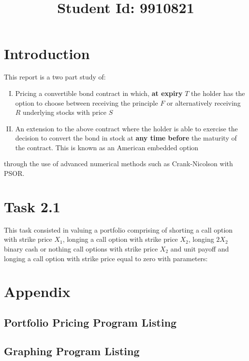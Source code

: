 \documentclass{article}
\begin{document}
\title{Student Id: 9910821}
\date{}

\maketitle
\section*{Introduction}
This report is a two part study of:
\begin{enumerate}[I)]
  \item Pricing a convertible bond contract in  which, \textbf{at expiry} $T$ the  holder  has  the option to  choose  between  receiving the principle $F$ or alternatively receiving $R$ underlying stocks with price $S$
  \item An extension to the above contract where the holder is able to exercise the decision to convert the bond in stock at \textbf{any time before} the maturity of the contract. This is known as an American embedded option
\end{enumerate}
through the use of advanced numerical methods such as Crank-Nicolson with PSOR.

\section*{Task 2.1}
This task consisted in valuing a portfolio comprising of shorting a call option with strike price $X_1$,
 longing a call option with strike price $X_2$, longing $2 X_2$ binary cash or nothing call options with strike
 price $X_2$ and unit payoff and longing a call option with strike price equal to zero with parameters:


\clearpage
\section*{Appendix}
\lstset{style=mystyle}
\subsection*{Portfolio Pricing Program Listing}

\subsection*{Graphing Program Listing}


\end{document}
